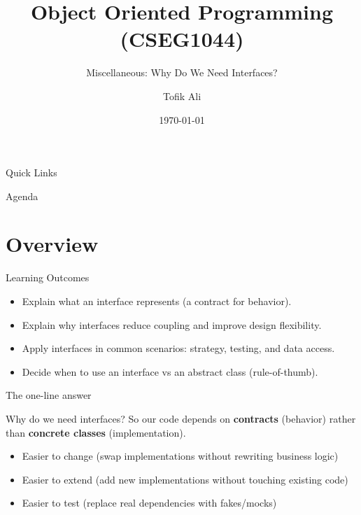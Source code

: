 \documentclass{beamer}
\title[OOPS with Java]{Object Oriented Programming (CSEG1044)}
\subtitle{Miscellaneous: Why Do We Need Interfaces?}
\author{Tofik Ali}
\institute{School of Computer Science, UPES Dehradun}
\date{\today}
\begin{document}
\begin{frame}[fragile]
  \titlepage
  \vspace{0.5em}
  \slidesources{\OOPSMiscWhyInterfacesSources}
\end{frame}

\begin{frame}{Quick Links}
  \centering
  \hyperlink{sec:overview}{}\hspace{0.6em}
  \hyperlink{sec:motivation}{}\hspace{0.6em}
  \hyperlink{sec:usecases}{}\hspace{0.6em}
  \hyperlink{sec:summary}{}
\end{frame}

\begin{frame}{Agenda}
  \tableofcontents
\end{frame}

\section{Overview}
\label{sec:overview}

\begin{frame}{Learning Outcomes}
  \begin{itemize}[<+->]
    \item Explain what an interface represents (a contract for behavior).
    \item Explain why interfaces reduce coupling and improve design flexibility.
    \item Apply interfaces in common scenarios: strategy, testing, and data access.
    \item Decide when to use an interface vs an abstract class (rule-of-thumb).
  \end{itemize}
\end{frame}

\begin{frame}{The one-line answer}
  \begin{block}{Why do we need interfaces?}
    So our code depends on \textbf{contracts} (behavior) rather than \textbf{concrete classes} (implementation).
  \end{block}

  \vspace{0.5em}
  \begin{itemize}[<+->]
    \item Easier to change (swap implementations without rewriting business logic)
    \item Easier to extend (add new implementations without touching existing code)
    \item Easier to test (replace real dependencies with fakes/mocks)
  \end{itemize}
\end{frame}
\end{document}
